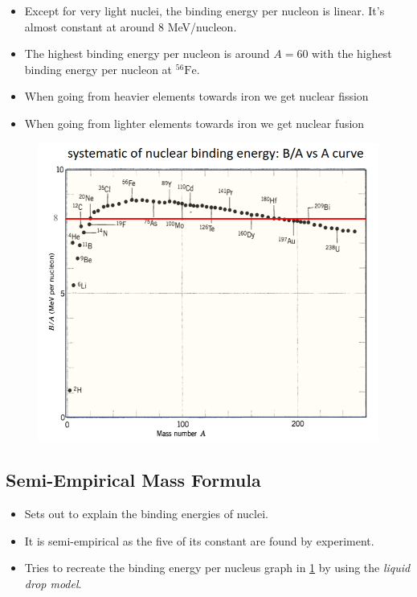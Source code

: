 \documentclass{article}
\begin{document}
\begin{itemize}
    \item Except for very light nuclei, the binding energy per nucleon is linear. It's almost constant at around 8 MeV/nucleon.
    \item The highest binding energy per nucleon is around $A = 60$ with the highest binding energy per nucleon at $^{56}\text{Fe}$. 
    \item When going from heavier elements towards iron we get nuclear fission
    \item When going from lighter elements towards iron we get nuclear fusion
\end{itemize}

\begin{figure}[h!]
\centering
\includegraphics[width = .75\textwidth]{BE_per_nucleon.png}
\caption{}
\label{fig: BE_per_nucleon}
\end{figure}

\subsection{Semi-Empirical Mass Formula}
\begin{itemize}
    \item Sets out to explain the binding energies of nuclei.
    \item It is semi-empirical as the five of its constant are found by experiment.
    \item Tries to recreate the binding energy per nucleus graph in \cref{fig: BE_per_nucleon} by using the \textit{liquid drop model}.
\end{itemize}
\end{document}
